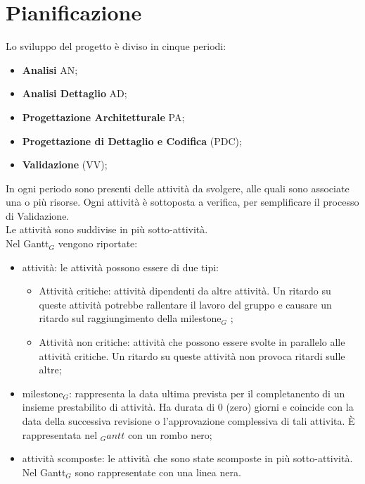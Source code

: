 \chapter{Pianificazione}
Lo sviluppo del progetto è diviso in cinque periodi:
\begin{itemize}
    \item \textbf{Analisi} AN;
    \item \textbf{Analisi Dettaglio} AD;
    \item \textbf{Progettazione Architetturale} PA;
    \item \textbf{Progettazione di Dettaglio e Codifica} (PDC);
    \item \textbf{Validazione} (VV);
\end{itemize}
In ogni periodo sono presenti delle attività da svolgere, alle quali sono associate una o più risorse. Ogni attività è sottoposta a verifica, per semplificare il processo di Validazione.\\
Le attività sono suddivise in più sotto-attività.\\
Nel Gantt$_{G}$ vengono riportate:
\begin{itemize}
    \item attività: le attività possono essere di due tipi:
    \begin{itemize}
        \item Attività critiche: attività dipendenti da altre attività. Un ritardo su queste attività potrebbe rallentare il lavoro del gruppo e causare un ritardo sul raggiungimento della milestone$_{G}$ ;
        \item Attività non critiche: attività che possono essere svolte in parallelo alle attività critiche. Un ritardo su queste attività non provoca ritardi sulle altre;
    \end{itemize}
    \item milestone$_{G}$: rappresenta la data ultima prevista per il completanento di un insieme prestabilito di attività. Ha durata di 0 (zero) giorni e coincide con la data della successiva revisione o l'approvazione complessiva di tali attivita. È rappresentata nel $_Gantt$ con un rombo nero;
    \item attività scomposte: le attività che sono state scomposte in più sotto-attività. Nel Gantt$_{G}$ sono rappresentate con una linea nera. 
\end{itemize}
